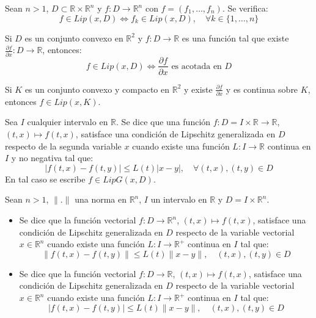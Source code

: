 \begin{proposition}
    Sean $n > 1$, $D \subset \mathbb{R} \times \mathbb{R}^n$ y $f: D \to \mathbb{R}^n$ con $f = (f_1, \dots, f_n)$.
    Se verifica:
    $$f \in Lip(x, D) \Leftrightarrow f_k \in Lip(x, D), \quad \forall k \in \{1, \dots, n\}$$
\end{proposition}

\begin{proposition}
    Si $D$ es un conjunto convexo en $\mathbb{R}^2$ y $f: D \to \mathbb{R}$ es una función tal que existe $\frac{\partial f}{\partial x}: D \to \mathbb{R}$, entonces:
    $$f \in Lip(x, D) \Leftrightarrow \frac{\partial f}{\partial x} \text{ es acotada en } D$$
\end{proposition}

\begin{remark}
    Si $K$ es un conjunto convexo y compacto en $\mathbb{R}^2$ y existe $\frac{\partial f}{\partial x}$ y es continua sobre $K$, entonces $f \in Lip(x, K)$.
\end{remark}

\begin{definition}
    Sea $I$ cualquier intervalo en $\mathbb{R}$.
    Se dice que una función $f: D = I \times \mathbb{R} \to \mathbb{R}$, $(t, x) \mapsto f(t, x)$, satisface una condición de Lipschitz generalizada en $D$ respecto de la segunda variable $x$ cuando existe una función $L: I \to \mathbb{R}$ continua en $I$ y no negativa tal que:
    $$|f(t, x) - f(t, y)| \leq L(t) |x-y|, \quad \forall (t, x), (t, y) \in D$$
    En tal caso se escribe $f \in LipG(x, D)$.
\end{definition}

\begin{definition}
    Sean $n > 1$, $\|.\|$ una norma en $\mathbb{R}^n$, $I$ un intervalo en $\mathbb{R}$ y $D = I \times \mathbb{R}^n$.
    \begin{itemize}
        \item Se dice que la función vectorial $f: D \to \mathbb{R}^n$, $(t, x) \mapsto f(t, x)$, satisface una condición de Lipschitz generalizada en $D$ respecto de la variable vectorial $x \in \mathbb{R}^n$ cuando existe una función $L: I \to \mathbb{R}^+$ continua en $I$ tal que:
              $$\|f(t, x) - f(t, y)\| \leq L(t)\|x-y\|, \quad (t, x), (t, y) \in D$$
        \item Se dice que la función vectorial $f: D \to \mathbb{R}$, $(t, x) \mapsto f(t, x)$, satisface una condición de Lipschitz generalizada en $D$ respecto de la variable vectorial $x \in \mathbb{R}^n$ cuando existe una función $L: I \to \mathbb{R}^+$ continua en $I$ tal que:
              $$|f(t, x) - f(t, y)| \leq L(t)\|x-y\|, \quad (t, x), (t, y) \in D$$
    \end{itemize}
\end{definition}

